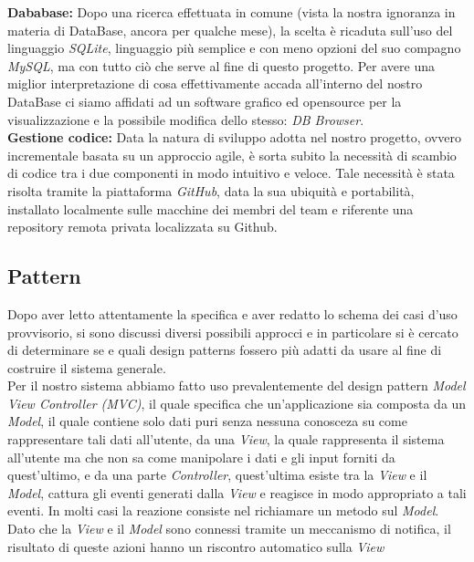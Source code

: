 \documentclass[a4paper,12pt,titlepage]{article}
\begin{document}
\textbf{Dababase: }Dopo una ricerca effettuata in comune (vista la nostra ignoranza in materia di DataBase, ancora per qualche mese), la scelta è ricaduta sull'uso del linguaggio \textit{SQLite}, linguaggio più semplice e con meno opzioni del suo compagno \textit{MySQL}, ma con tutto ciò che serve al fine di questo progetto. Per avere una miglior interpretazione di cosa effettivamente accada all'interno del nostro DataBase ci siamo affidati ad un software grafico ed opensource per la visualizzazione e la possibile modifica dello stesso: \textit{DB Browser}.\\

\textbf{Gestione codice: }Data la natura di sviluppo adotta nel nostro progetto, ovvero incrementale basata su un approccio agile, è sorta subito la necessità di scambio di codice tra i due componenti in modo intuitivo e veloce. Tale necessità è stata risolta tramite la piattaforma \textit{GitHub}, data la sua ubiquità e portabilità, installato localmente sulle macchine dei membri del team e riferente una repository remota privata localizzata su Github.\\

\subsection{Pattern}\label{sec:pattern}
Dopo aver letto attentamente la specifica e aver redatto lo schema dei casi d’uso provvisorio, si sono discussi diversi possibili approcci e in particolare si è cercato di determinare se e quali design patterns fossero più adatti da usare al fine di costruire il
sistema generale.\\ Per il nostro sistema abbiamo fatto uso prevalentemente del design pattern \textit{Model View Controller (MVC)}, il quale specifica che un'applicazione sia composta da un \textit{Model}, il quale contiene solo dati puri senza nessuna conosceza su come rappresentare tali dati all'utente, da una \textit{View}, la quale rappresenta il sistema all'utente ma che non sa come manipolare i dati e gli input forniti da quest'ultimo, e da una parte \textit{Controller}, quest'ultima esiste tra la \textit{View} e il \textit{Model}, cattura gli eventi generati dalla \textit{View} e reagisce in modo appropriato a tali eventi. In molti casi la reazione consiste nel richiamare un metodo sul \textit{Model}. Dato che la \textit{View} e il \textit{Model} sono connessi tramite un meccanismo di notifica, il risultato di queste azioni hanno un riscontro automatico sulla \textit{View}
\end{document}
